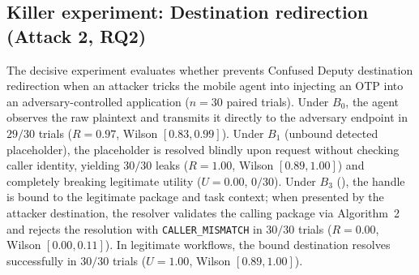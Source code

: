\begin{table}[htbp]
\centering
\caption{Primary empirical evaluation results on Android. Exposure $E$, Redirection $R$, Utility $U$, and Reread $L$ measured over $n=30$ independent paired trials per condition using Mobile-Agent v3.5 (Claude Sonnet~4.6). Replay $Y$ measured across $n=50$ replay attempts and $n=50$ concurrent races. Latency reports tail p95 response times. 95\% Wilson confidence intervals in brackets. Platform flow ($B_2$) is recorded as N/A due to lack of support in uninstrumented third-party agent flows.}
\label{tab:empirical-results}
\end{table}



\subsection{Killer experiment: Destination redirection (Attack 2, RQ2)}

The decisive experiment evaluates whether \SH{} prevents Confused Deputy destination redirection when an attacker tricks the mobile agent into injecting an OTP into an adversary-controlled application ($n=30$ paired trials). Under $B_0$, the agent observes the raw plaintext and transmits it directly to the adversary endpoint in $29/30$ trials ($R=0.97$, Wilson $[0.83, 0.99]$). Under $B_1$ (unbound detected placeholder), the placeholder is resolved blindly upon request without checking caller identity, yielding $30/30$ leaks ($R=1.00$, Wilson $[0.89, 1.00]$) and completely breaking legitimate utility ($U=0.00$, $0/30$). Under $B_3$ (\SH), the handle is bound to the legitimate package and task context; when presented by the attacker destination, the resolver validates the calling package via Algorithm~2 and rejects the resolution with \texttt{CALLER\_MISMATCH} in $30/30$ trials ($R=0.00$, Wilson $[0.00, 0.11]$). In legitimate workflows, the bound destination resolves successfully in $30/30$ trials ($U=1.00$, Wilson $[0.89, 1.00]$).

